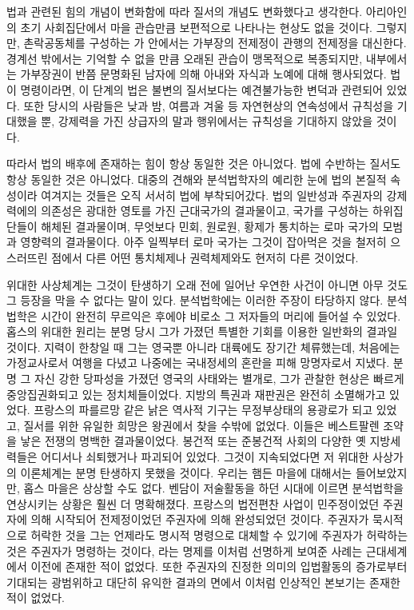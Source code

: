 법과 관련된 힘의 개념이 변화함에 따라
질서의 개념도 변화했다고 생각한다.
아리아인의 초기 사회집단에서
마을 관습만큼 보편적으로 나타나는 현상도 없을 것이다.
그렇지만, 촌락공동체를 구성하는 가 안에서는
가부장의 전제정이
관행의 전제정을 대신한다.
경계선 밖에서는 기억할 수 없을 만큼 오래된 관습이 맹목적으로 복종되지만,
내부에서는
가부장권이
반쯤 문명화된 남자에 의해
아내와 자식과 노예에 대해 행사되었다.
법이 명령이라면,
이 단계의 법은 불변의 질서보다는 예견불가능한 변덕과 관련되어 있었다.
또한
당시의 사람들은
낮과 밤, 여름과 겨울 등
자연현상의 연속성에서
규칙성을 기대했을 뿐,
강제력을 가진 상급자의 말과 행위에서는 규칙성을 기대하지 않았을 것이다.

따라서 법의 배후에 존재하는 힘이 항상 동일한 것은 아니었다.
법에 수반하는 질서도 항상 동일한 것은 아니었다.
대중의 견해와 분석법학자의 예리한 눈에
법의 본질적 속성이라 여겨지는 것들은 오직 서서히 법에 부착되어갔다.
법의 일반성과 주권자의 강제력에의 의존성은
광대한 영토를 가진 근대국가의 결과물이고,
국가를 구성하는 하위집단들이 해체된 결과물이며,
무엇보다 민회, 원로원, 황제가 통치하는 로마 국가의 모범과 영향력의 결과물이다.
아주 일찍부터
로마 국가는
그것이 잡아먹은 것을 철저히 으스러뜨린 점에서
다른 어떤 통치체제나 권력체제와도 현저히 다른 것이었다.

위대한 사상체계는
그것이 탄생하기 오래 전에 일어난
우연한 사건이 아니면
아무 것도 그 등장을 막을 수 없다는 말이 있다.
분석법학에는
이러한 주장이
타당하지 않다.
분석법학은 시간이 완전히 무르익은 후에야 비로소 그 저자들의 머리에
들어설 수 있었다.
홉스의 위대한 원리는 분명
당시 그가 가졌던 특별한 기회를 이용한 일반화의 결과일 것이다.
지력이 한창일 때 그는 영국뿐 아니라 대륙에도 장기간 체류했는데,
처음에는 가정교사로서 여행을 다녔고
나중에는 국내정세의 혼란을 피해 망명자로서 지냈다.
분명 그 자신 강한 당파성을 가졌던 영국의 사태와는 별개로,
그가 관찰한 현상은 빠르게 중앙집권화되고 있는 정치체들이었다.
지방의 특권과 재판권은 완전히 소멸해가고 있었다.
프랑스의 파를르망 같은 낡은 역사적 기구는
무정부상태의 용광로가 되고 있었고,
질서를 위한 유일한 희망은 왕권에서 찾을 수밖에 없었다.
이들은 베스트팔렌 조약을 낳은 전쟁의 명백한 결과물이었다.
봉건적 또는 준봉건적 사회의 다양한 옛 지방세력들은
어디서나 쇠퇴했거나 파괴되어 있었다.
그것이 지속되었다면 저 위대한 사상가의 이론체계는 분명
탄생하지 못했을 것이다.
우리는 햄든 마을에 대해서는 들어보았지만,
홉스 마을은 상상할 수도 없다.
벤담이 저술활동을 하던 시대에 이르면
분석법학을 연상시키는 상황은 훨씬 더 명확해졌다.
프랑스의 법전편찬 사업이
민주정이었던 주권자에 의해 시작되어
전제정이었던 주권자에 의해 완성되었던 것이다.
주권자가 묵시적으로 허락한 것을
그는 언제라도 명시적 명령으로 대체할 수 있기에
주권자가 허락하는 것은 주권자가 명령하는 것이다, 라는 명제를
이처럼 선명하게 보여준 사례는 근대세계에서
이전에 존재한 적이 없었다.
또한 주권자의 진정한 의미의 입법활동의 증가로부터 기대되는
광범위하고 대단히 유익한 결과의 면에서
이처럼 인상적인 본보기는 존재한 적이 없었다.

